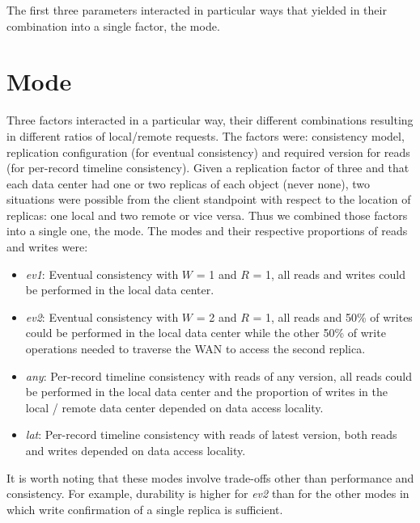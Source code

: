 \documentclass[man,floatsintext,12pt]{apa6}
\begin{document}
The first three parameters interacted in particular ways that yielded in their
combination into a single factor, the mode.

\section{Mode}

Three factors interacted in a particular way, their different combinations
resulting in different ratios of local/remote requests. The factors were:
consistency model, replication configuration (for eventual consistency) and
required version for reads (for per-record timeline consistency). Given a
replication factor of three and that each data center had one or two replicas
of each object (never none), two situations were possible from the client
standpoint with respect to the location of replicas: one local and two remote
or vice versa. Thus we combined those factors into a single one, the mode. The
modes and their respective proportions of reads and writes were:

\begin{itemize}

\item \textit{ev1}: Eventual consistency with $W$ = 1 and $R$ = 1, all reads and writes could be performed in the local data
center.

\item \textit{ev2}: Eventual consistency with $W$ = 2 and $R$ = 1, all reads and 50\% of writes could be performed in the
local data center while the other 50\% of write operations needed to traverse
the WAN to access the second replica.

\item \textit{any}: Per-record timeline consistency with reads of any version, all reads could be performed in the local data center and
the proportion of writes in the local / remote data center depended on data
access locality.

\item \textit{lat}: Per-record timeline consistency with reads of latest version, both reads and writes depended on data access locality.

\end{itemize}

It is worth noting that these modes involve trade-offs other than performance
and consistency. For example, durability is higher for \textit{ev2} than for
the other modes in which write confirmation of a single replica is sufficient.
\end{document}
